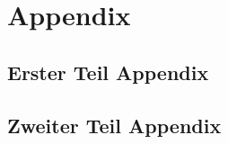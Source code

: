 %

\chapter{Appendix}
\label{ch:Appendix}

\section{Erster Teil Appendix}
\label{app:first_appendix}

\section{Zweiter Teil Appendix}
\label{app:second_appendix}

